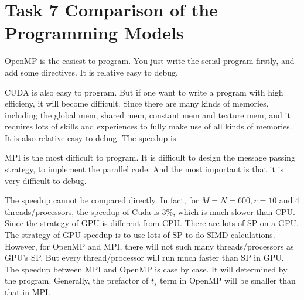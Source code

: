 \section{Task 7 Comparison of the Programming Models}

OpenMP is the easiest to program. You just write the serial program firstly, and
add some directives. It is relative easy to debug.

CUDA is also easy to program. But if one want to write a program with high efficieny,
it will become difficult. Since there are many kinds of memories, including the 
global mem, shared mem, constant mem and texture mem, and it requires lots of
skills and experiences to fully make use of all kinds of memories. It is also
relative easy to debug. The speedup is 

MPI is the most difficult to program. It is difficult to design the message passing
strategy, to implement the parallel code. And the most important is that it is very 
difficult to debug.

The speedup cannot be compared directly. 
In fact, for $M=N=600, r=10$ and $4$ threads/processors, the speedup of Cuda is $3\%$,
which is much slower than CPU. Since the strategy of GPU is different from CPU.
There are lots of SP on a GPU. The strategy of GPU speedup is to use lots of SP
to do SIMD calculations. However, for OpenMP and MPI, there will not such many
threads/processors as GPU's SP. But every thread/processor will run much faster 
than SP in GPU. The speedup between MPI and OpenMP is case by case. It will
determined by the program. Generally, the prefactor of $t_s$ term in OpenMP will be 
smaller than that in MPI.
